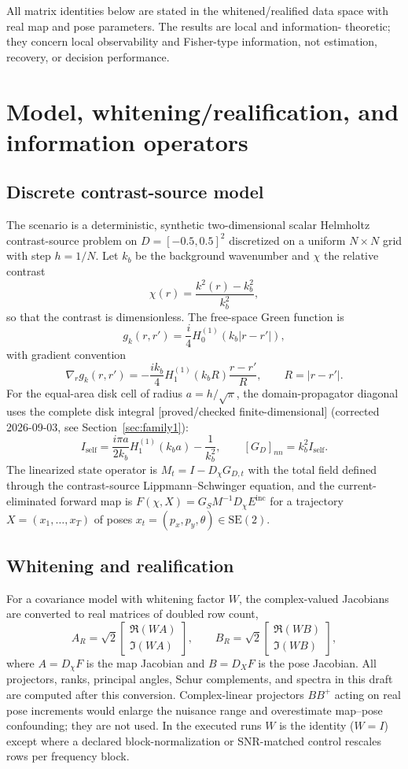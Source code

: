 \documentclass[12pt]{article}
\newcommand{\FDL}{\textnormal{[proved/checked finite-dimensional]}}
\begin{document}
All matrix identities below are stated in the whitened/realified data space
with real map and pose parameters. The results are local and information-
theoretic; they concern local observability and Fisher-type information, not
estimation, recovery, or decision performance.

\section{Model, whitening/realification, and information operators}\label{sec:model}

\subsection{Discrete contrast-source model}

The scenario is a deterministic, synthetic two-dimensional scalar Helmholtz
contrast-source problem on $D=[-0.5,0.5]^2$ discretized on a uniform $N\times
N$ grid with step $h=1/N$. Let $k_b$ be the background wavenumber and
$\chi$ the relative contrast
\[
\chi(r)=\frac{k^2(r)-k_b^2}{k_b^2},
\]
so that the contrast is dimensionless. The free-space Green function is
\[
g_k(r,r')=\frac{i}{4}H_0^{(1)}(k_b|r-r'|),
\]
with gradient convention
\[
\nabla_r g_k(r,r')=-\frac{i k_b}{4}H_1^{(1)}(k_b R)\frac{r-r'}{R},\qquad
R=|r-r'|.
\]
For the equal-area disk cell of radius $a=h/\sqrt{\pi}$, the domain-propagator
diagonal uses the complete disk integral \FDL{} (corrected 2026-09-03, see
Section~\ref{sec:family1}):
\[
I_{\mathrm{self}}=\frac{i\pi a}{2k_b}H_1^{(1)}(k_b a)-\frac{1}{k_b^2},\qquad
[G_D]_{nn}=k_b^2 I_{\mathrm{self}}.
\]
The linearized state operator is $M_t=I-D_\chi G_{D,t}$ with the total field
defined through the contrast-source Lippmann--Schwinger equation, and the
current-eliminated forward map is $F(\chi,X)=G_S M^{-1} D_\chi E^{\mathrm{inc}}$
for a trajectory $X=(x_1,\ldots,x_T)$ of poses $x_t=(p_x,p_y,\theta)\in
\mathrm{SE}(2)$.

\subsection{Whitening and realification}

For a covariance model with whitening factor $W$, the complex-valued Jacobians
are converted to real matrices of doubled row count,
\[
A_R=\sqrt{2}\begin{bmatrix}\Re(WA)\\\Im(WA)\end{bmatrix},\qquad
B_R=\sqrt{2}\begin{bmatrix}\Re(WB)\\\Im(WB)\end{bmatrix},
\]
where $A=D_\chi F$ is the map Jacobian and $B=D_X F$ is the pose Jacobian.
All projectors, ranks, principal angles, Schur complements, and spectra in
this draft are computed after this conversion. Complex-linear projectors
$BB^+$ acting on real pose increments would enlarge the nuisance range and
overestimate map--pose confounding; they are not used. In the executed runs
$W$ is the identity ($W=I$) except where a declared block-normalization or
SNR-matched control rescales rows per frequency block.
\end{document}
